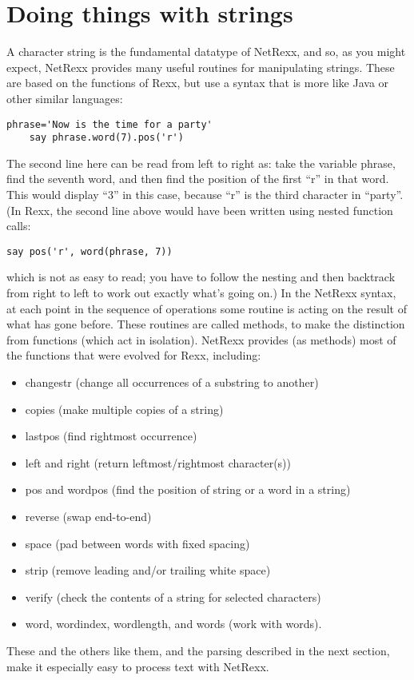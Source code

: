 \section{Doing things with strings}
A character string is the fundamental datatype of NetRexx, and so, as
you might expect, NetRexx provides many useful routines for
manipulating strings. These are based on the functions of Rexx, but
use a syntax that is more like Java or other similar languages:
\begin{lstlisting}[label=strings,caption=Strings]
    phrase='Now is the time for a party'
    say phrase.word(7).pos('r')
\end{lstlisting}
The second line here can be read from left to right as:
take the variable phrase, find the seventh word, and then find the position of
the first “r” in that word.
This would display “3” in this case, because “r” is the third character in “party”.
(In Rexx, the second line above would have been written using nested
function calls:
\begin{lstlisting}[label=nested,caption=Nested]
    say pos('r', word(phrase, 7))
\end{lstlisting}
which is not as easy to read; you have to follow the nesting and then backtrack from right to left to work out exactly what’s going on.)
In the NetRexx syntax, at each point in the sequence of operations
some routine is acting on the result of what has gone before. These
routines are called methods, to make the distinction from functions
(which act in isolation). NetRexx provides (as methods) most of the
functions that were evolved for Rexx, including:
\begin{itemize}
\item changestr (change all occurrences of a substring to another)
\item copies (make multiple copies of a string)
\item lastpos (find rightmost occurrence)
\item left and right (return leftmost/rightmost character(s))
\item pos and wordpos (find the position of string or a word in a string)
\item reverse (swap end-to-end)
\item space (pad between words with fixed spacing)
\item strip (remove leading and/or trailing white space)
\item verify (check the contents of a string for selected characters)
\item word, wordindex, wordlength, and words (work with words).
\end{itemize}
These and the others like them, and the parsing described in the next section, make it especially easy to process text with NetRexx.

